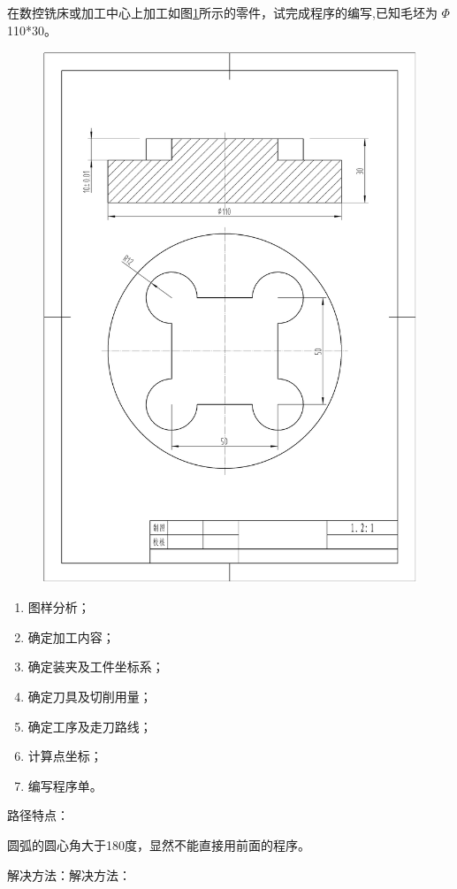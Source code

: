 在数控铣床或加工中心上加工如图\ref{fig:4-1}所示的零件，试完成程序的编写,已知毛坯为 $\Phi$ 110*30。

\begin{figure}[h]
    \centering
    \includegraphics[width=0.8\linewidth,trim=50 150 50 100,clip]{data/image/5-2.jpg}
    \caption{}
    \label{fig:4-1}
\end{figure}

\begin{enumerate}[1、]
    \item 图样分析；
    \item 确定加工内容；
    \item 确定装夹及工件坐标系；
    \item 确定刀具及切削用量；
    \item 确定工序及走刀路线；
    \item 计算点坐标；
    \item 编写程序单。
\end{enumerate}


路径特点：

圆弧的圆心角大于180度，显然不能直接用前面的程序。

解决方法：解决方法：



